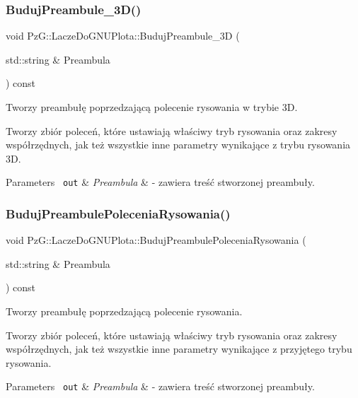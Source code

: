 \subsubsection{\texorpdfstring{BudujPreambule\_3D()}{BudujPreambule\_3D()}}
{\footnotesize\ttfamily void Pz\+G\+::\+Lacze\+Do\+G\+N\+U\+Plota\+::\+Buduj\+Preambule\+\_\+3D (\begin{DoxyParamCaption}\item[{std\+::string \&}]{Preambula }\end{DoxyParamCaption}) const\hspace{0.3cm}{\ttfamily [protected]}}



Tworzy preambułę poprzedzającą polecenie rysowania w trybie 3D. 

Tworzy zbiór poleceń, które ustawiają właściwy tryb rysowania oraz zakresy współrzędnych, jak też wszystkie inne parametry wynikające z trybu rysowania 3D. 
\begin{DoxyParams}[1]{Parameters}
\mbox{\texttt{ out}}  & {\em Preambula} & -\/ zawiera treść stworzonej preambuły. \\
\hline
\end{DoxyParams}
\mbox{\label{class_pz_g_1_1_lacze_do_g_n_u_plota_a0da98f68f533070d5a32adbdb519cf56}} 
\subsubsection{\texorpdfstring{BudujPreambulePoleceniaRysowania()}{BudujPreambulePoleceniaRysowania()}}
{\footnotesize\ttfamily void Pz\+G\+::\+Lacze\+Do\+G\+N\+U\+Plota\+::\+Buduj\+Preambule\+Polecenia\+Rysowania (\begin{DoxyParamCaption}\item[{std\+::string \&}]{Preambula }\end{DoxyParamCaption}) const\hspace{0.3cm}{\ttfamily [protected]}}



Tworzy preambułę poprzedzającą polecenie rysowania. 

Tworzy zbiór poleceń, które ustawiają właściwy tryb rysowania oraz zakresy współrzędnych, jak też wszystkie inne parametry wynikające z przyjętego trybu rysowania. 
\begin{DoxyParams}[1]{Parameters}
\mbox{\texttt{ out}}  & {\em Preambula} & -\/ zawiera treść stworzonej preambuły. \\
\hline
\end{DoxyParams}
\mbox{\label{class_pz_g_1_1_lacze_do_g_n_u_plota_af8be8aeb3b1b524fab67d4411cba5b9e}} 
